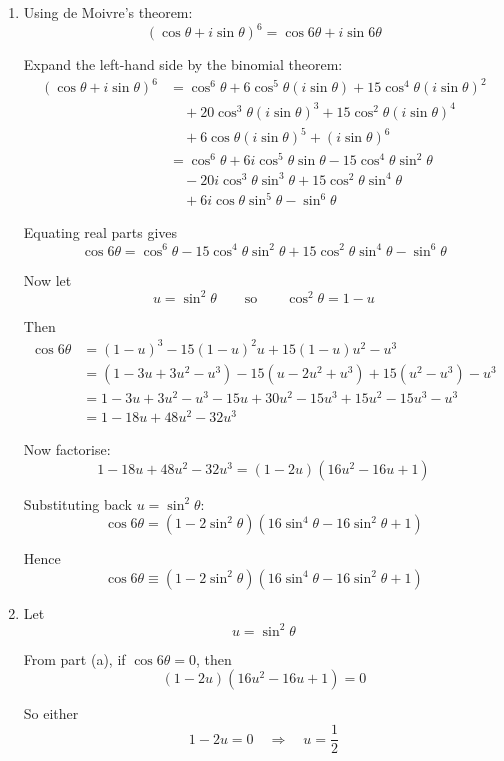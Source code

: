 \documentclass[leqno]{article}
\begin{document}
\begin{enumerate}[
  label=\textbf{\arabic*.},
  leftmargin=*,
  topsep=0pt,
  partopsep=0pt,
  parsep=0pt
]
\vspace*{10pt}

\begin{djsSolution}
\begin{enumerate}[label=\textbf{(\alph*)}]
  \item Using de Moivre's theorem:
\[
(\cos\theta+i\sin\theta)^6=\cos6\theta+i\sin6\theta
\]

Expand the left-hand side by the binomial theorem:
\begin{align*}
(\cos\theta+i\sin\theta)^6
&=\cos^6\theta+6\cos^5\theta(i\sin\theta)+15\cos^4\theta(i\sin\theta)^2 \\
&\quad +20\cos^3\theta(i\sin\theta)^3+15\cos^2\theta(i\sin\theta)^4 \\
&\quad +6\cos\theta(i\sin\theta)^5+(i\sin\theta)^6 \\
&=\cos^6\theta+6i\cos^5\theta\sin\theta-15\cos^4\theta\sin^2\theta \\
&\quad -20i\cos^3\theta\sin^3\theta+15\cos^2\theta\sin^4\theta \\
&\quad +6i\cos\theta\sin^5\theta-\sin^6\theta
\end{align*}

Equating real parts gives
\[
\cos6\theta=\cos^6\theta-15\cos^4\theta\sin^2\theta+15\cos^2\theta\sin^4\theta-\sin^6\theta
\]

Now let
\[
u=\sin^2\theta
\qquad \text{so} \qquad
\cos^2\theta=1-u
\]

Then
\begin{align*}
\cos6\theta
&=(1-u)^3-15(1-u)^2u+15(1-u)u^2-u^3 \\
&=(1-3u+3u^2-u^3)-15(u-2u^2+u^3)+15(u^2-u^3)-u^3 \\
&=1-3u+3u^2-u^3-15u+30u^2-15u^3+15u^2-15u^3-u^3 \\
&=1-18u+48u^2-32u^3
\end{align*}

Now factorise:
\[
1-18u+48u^2-32u^3=(1-2u)(16u^2-16u+1)
\]

Substituting back \(u=\sin^2\theta\):
\[
\cos6\theta=(1-2\sin^2\theta)(16\sin^4\theta-16\sin^2\theta+1)
\]

Hence
\[
\cos 6\theta \equiv (1 - 2\sin^2\theta)(16\sin^4\theta - 16\sin^2\theta + 1)
\]

  \item Let
\[
u=\sin^2\theta
\]

From part (a), if \(\cos6\theta=0\), then
\[
(1-2u)(16u^2-16u+1)=0
\]

So either
\[
1-2u=0\quad\Longrightarrow\quad u=\frac12
\]


\end{enumerate}
\end{djsSolution}
\end{enumerate}
\end{document}
